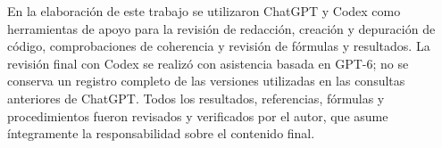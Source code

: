 En la elaboración de este trabajo se utilizaron ChatGPT y Codex como herramientas
de apoyo para la revisión de redacción, creación y depuración de código,
comprobaciones de coherencia y revisión de fórmulas y resultados. La revisión final
con Codex se realizó con asistencia basada en GPT-6; no se conserva un registro
completo de las versiones utilizadas en las consultas anteriores de ChatGPT.
Todos los resultados, referencias, fórmulas y procedimientos fueron revisados y
verificados por el autor, que asume íntegramente la responsabilidad sobre el
contenido final.
